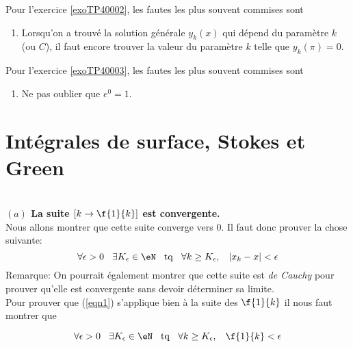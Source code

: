 Pour l'exercice \ref{exoTP40002}, les fautes les plus souvent commises sont
\begin{enumerate}

	\item
		Lorsqu'on a trouvé la solution générale $y_k(x)$ qui dépend du paramètre $k$ (ou $C$), il faut encore trouver la valeur du paramètre $k$ telle que $y_k(\pi)=0$.

\end{enumerate}

Pour l'exercice \ref{exoTP40003}, les fautes les plus souvent commises sont
\begin{enumerate}

	\item
		Ne pas oublier que $e^0=1$.
\end{enumerate}



\section{Intégrales de surface, Stokes et Green}


\setcounter{CountExercice}{0}


\\

{\bf $(a)$ La suite $[k\rightarrow \f{1}{k}]$ est convergente.}\\

\noindent Nous allons montrer que cette suite converge vers $0$. Il faut donc prouver la chose suivante: 
   \begin{equation}\label{eqn1}\forall \epsilon >0 \hspace{0,3cm} \exists K_\epsilon \in \eN \hspace{0,3cm} {\rm tq}  \hspace{0,3cm}  \forall k\geq K_\epsilon, \hspace{0,3cm}  |x_k-x|<\epsilon\end{equation}
{Remarque}: On pourrait également montrer que cette suite est {\it de Cauchy} pour prouver qu'elle est convergente sans devoir déterminer sa limite.\\

\noindent Pour prouver que (\ref{eqn1}) s'applique bien à la suite des $\f{1}{k}$ il nous faut montrer que

   \begin{equation}\label{eqn2}\forall \epsilon >0 \hspace{0,3cm} \exists K_\epsilon \in \eN \hspace{0,3cm} {\rm tq}  \hspace{0,3cm}  \forall k\geq K_\epsilon,  \hspace{0,3cm} \f{1}{k}<\epsilon\end{equation}

